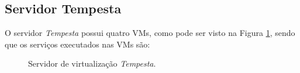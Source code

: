 \subsection{Servidor Tempesta}
\label{section:serv_tempesta}

O servidor \textit{Tempesta} possui quatro \acp{VM}, como pode ser visto na Figura \ref{fig:servidor_tempesta}, sendo que os serviços executados 
nas \acp{VM} são:

\begin{figure}[h!]
 \centering
 \caption{Servidor de virtualização \textit{Tempesta}.}
 \label{fig:servidor_tempesta}
\end{figure}

